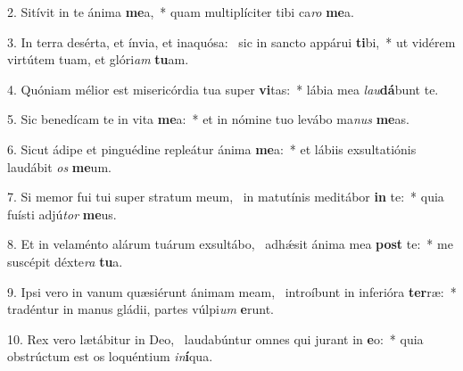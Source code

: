 2. Sitívit in te ánima \textbf{me}a,~*  quam multiplíciter tibi ca\textit{ro} \textbf{me}a.\

3. In terra desérta, et ínvia, et inaquósa: \dag\  sic in sancto appárui \textbf{ti}bi,~*  ut vidérem virtútem tuam, et glóri\textit{am} \textbf{tu}am.\

4. Quóniam mélior est misericórdia tua super \textbf{vi}tas:~*  lábia mea \textit{lau}\textbf{dá}bunt te.\

5. Sic benedícam te in vita \textbf{me}a:~*  et in nómine tuo levábo ma\textit{nus} \textbf{me}as.\

6. Sicut ádipe et pinguédine repleátur ánima \textbf{me}a:~*  et lábiis exsultatiónis laudábit \textit{os} \textbf{me}um.\

7. Si memor fui tui super stratum meum, \dag\  in matutínis meditábor \textbf{in} te:~*  quia fuísti adjú\textit{tor} \textbf{me}us.\

8. Et in velaménto alárum tuárum exsultábo, \dag\  adhǽsit ánima mea \textbf{post} te:~*  me suscépit déxte\textit{ra} \textbf{tu}a.\

9. Ipsi vero in vanum quæsiérunt ánimam meam, \dag\  introíbunt in inferióra \textbf{ter}ræ:~*  tradéntur in manus gládii, partes vúlpi\textit{um} \textbf{e}runt.\

10. Rex vero lætábitur in Deo, \dag\  laudabúntur omnes qui jurant in \textbf{e}o:~*  quia obstrúctum est os loquéntium \textit{in}\textbf{í}qua.\


